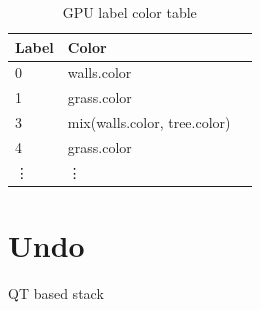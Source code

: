 \begin{table}[ht]
	\begin{center}
	\begin{tabular}{|l|l|l|}
	\hline
	Label & Color  \\
	\hline
	0       & walls.color \\
	1       & grass.color \\
	3       & mix(walls.color, tree.color)	\\
	4       & grass.color	\\
	\vdots     & \vdots      \\
	\hline
	\end{tabular}
	\end{center}
	\caption{GPU label color table}
\end{table}


\section{Undo}
QT based stack